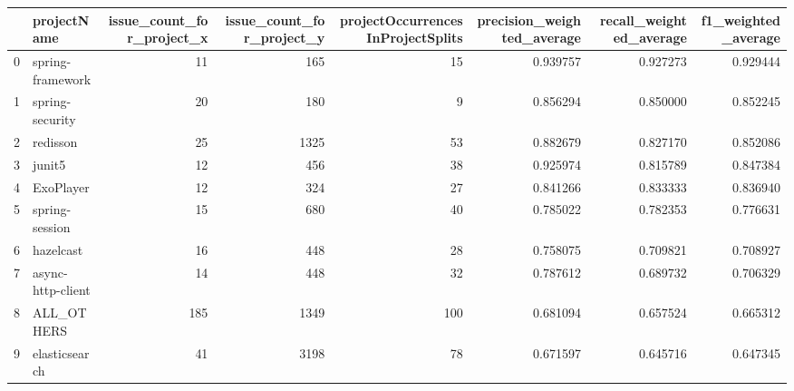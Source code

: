 \begin{tabular}{llrrrrrr}
\toprule
{} &        projectName &  issue\_count\_for\_project\_x &  issue\_count\_for\_project\_y &  projectOccurrencesInProjectSplits &  precision\_weighted\_average &  recall\_weighted\_average &  f1\_weighted\_average \\
\midrule
0  &   spring-framework &                         11 &                        165 &                                 15 &                    0.939757 &                 0.927273 &             0.929444 \\
1  &    spring-security &                         20 &                        180 &                                  9 &                    0.856294 &                 0.850000 &             0.852245 \\
2  &           redisson &                         25 &                       1325 &                                 53 &                    0.882679 &                 0.827170 &             0.852086 \\
3  &             junit5 &                         12 &                        456 &                                 38 &                    0.925974 &                 0.815789 &             0.847384 \\
4  &          ExoPlayer &                         12 &                        324 &                                 27 &                    0.841266 &                 0.833333 &             0.836940 \\
5  &     spring-session &                         15 &                        680 &                                 40 &                    0.785022 &                 0.782353 &             0.776631 \\
6  &          hazelcast &                         16 &                        448 &                                 28 &                    0.758075 &                 0.709821 &             0.708927 \\
7  &  async-http-client &                         14 &                        448 &                                 32 &                    0.787612 &                 0.689732 &             0.706329 \\
8  &         ALL\_OTHERS &                        185 &                       1349 &                                100 &                    0.681094 &                 0.657524 &             0.665312 \\
9  &      elasticsearch &                         41 &                       3198 &                                 78 &                    0.671597 &                 0.645716 &             0.647345 \\

\end{tabular}
